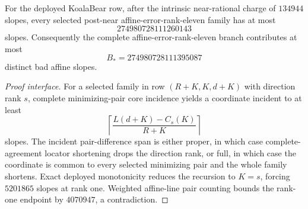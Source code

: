 \begin{theorem}
\label{thm:mca-kb-rank11-global-core-descent}
For the deployed KoalaBear row, after the intrinsic near-rational charge of
$134944$ slopes, every selected post-near affine-error-rank-eleven family has
at most
\[
 274980728111260143
\]
slopes.  Consequently the complete affine-error-rank-eleven branch contributes
at most
\[
 B_*=274980728111395087
\]
distinct bad affine slopes.
\end{theorem}

\begin{proof}[Proof interface]
For a selected family in row $(R+K,K,d+K)$ with direction rank $s$, complete
minimizing-pair core incidence yields a coordinate incident to at least
\[
 \left\lceil\frac{L(d+K)-C_s(K)}{R+K}\right\rceil
\]
slopes.  The incident pair-difference span is either proper, in which case
complete-agreement locator shortening drops the direction rank, or full, in
which case the coordinate is common to every selected minimizing pair and the
whole family shortens.  Exact deployed monotonicity reduces the recursion to
$K=s$, forcing $5201865$ slopes at rank one.  Weighted affine-line pair
counting bounds the rank-one endpoint by $4070947$, a contradiction.
\end{proof}
